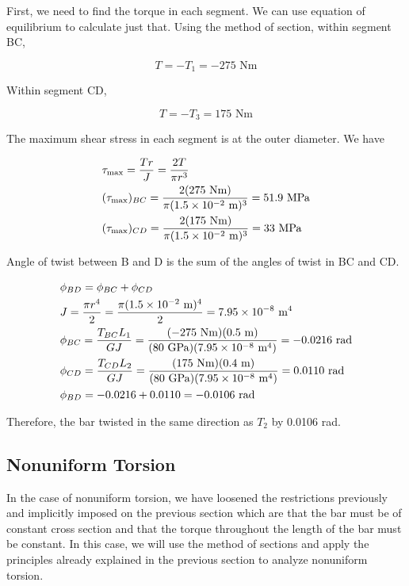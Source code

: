 \documentclass[
10pt,
a4paper,
openany,
svgnames,
]{book}
\begin{document}
\begin{solution}
First, we need to find the torque in each segment. We can use equation of equilibrium to calculate just that.
Using the method of section, within segment BC,

$$T =  - T_1 =  - 275\text{ Nm}$$

Within segment CD,

\[T =  - T_3 = 175\text{ Nm}\]

The maximum shear stress in each segment is at the outer diameter. We have

\[\begin{gathered}
  \tau _{\max } = \frac{Tr}{J} = \frac{2T}{\pi r^3} \hfill \\
  (\tau _{\max })_{BC} = \frac{2(275\text{ Nm})}{\pi (1.5 \times 10^{ - 2}\text{ m})^3} = 51.9\text{ MPa} \hfill \\
  (\tau _{\max })_{CD} = \frac{2(175\text{ Nm})}{\pi (1.5 \times 10^{ - 2}\text{ m})^3} = 33\text{ MPa} \hfill \\ 
\end{gathered} \]

Angle of twist between B and D is the sum of the angles of twist in BC and CD.

\[\begin{gathered}
  \phi_{BD} = \phi _{BC} + \phi _{CD} \hfill \\
  J = \frac{\pi r^4}{2} = \frac{\pi (1.5 \times 10^{ - 2} \text{ m})^4}{2} =
  7.95 \times 10^{ - 8} \text{ m}^4 \hfill \\
  \phi_{BC} = \frac{T_{BC}L_1}{GJ} = \frac{( - 275\text{ Nm})(0.5\text{ m})}{(80\text{ GPa})(7.95 \times 10^{-8}\text{ m}^4)} =  - 0.0216\text{ rad} \hfill \\
  \phi_{CD} = \frac{T_{CD}L_2}{GJ} = \frac{(175\text{ Nm})(0.4\text{ m})}{(80\text{ GPa})(7.95 \times 10^{-8}\text{ m}^4)} = 0.0110\text{ rad} \hfill \\
  \phi_{BD} =  - 0.0216 + 0.0110 =  - 0.0106\text{ rad} \hfill \\ 
\end{gathered} \]

Therefore, the bar twisted in the same direction as $T_2$ by 0.0106 rad.
\end{solution}

\subsection{Nonuniform Torsion}

In the case of nonuniform torsion, we have loosened the restrictions previously and implicitly imposed on the previous section which are that the bar must be of constant cross section and that the torque throughout the length of the bar must be constant. In this case, we will use the method of sections and apply the principles already explained in the previous section to analyze nonuniform torsion.
\end{document}
